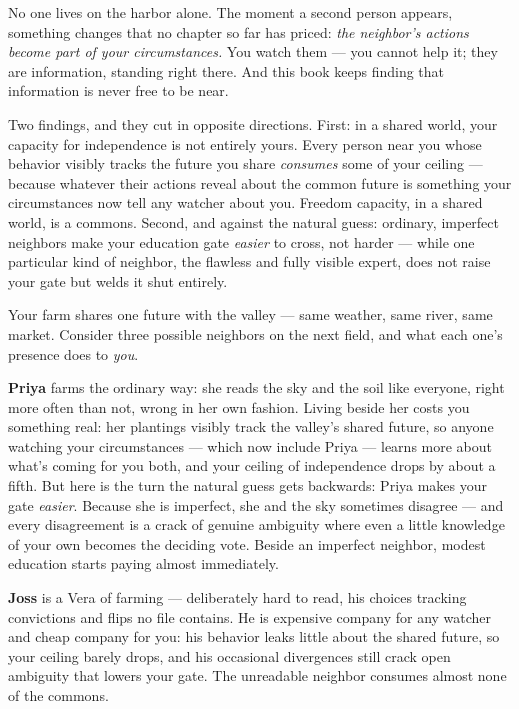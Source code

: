 
No one lives on the harbor alone. The moment a second person appears,
something changes that no chapter so far has priced: \emph{the neighbor's
actions become part of your circumstances.} You watch them --- you
cannot help it; they are information, standing right there. And this
book keeps finding that information is never free to be near.

Two findings, and they cut in opposite directions. First: in a shared
world, your capacity for independence is not entirely yours. Every
person near you whose behavior visibly tracks the future you share
\emph{consumes} some of your ceiling --- because whatever their actions
reveal about the common future is something your circumstances now
tell any watcher about you. Freedom capacity, in a shared world, is a
commons. Second, and against the natural guess: ordinary, imperfect neighbors make your education gate
\emph{easier} to cross, not harder --- while one particular kind of neighbor,
the flawless and fully visible expert, does not raise your gate but
welds it shut entirely.


Your farm shares one future with the valley --- same weather, same
river, same market. Consider three possible neighbors on the next
field, and what each one's presence does to \emph{you}.

\textbf{Priya} farms the ordinary way: she reads the sky and the soil like
everyone, right more often than not, wrong in her own fashion. Living
beside her costs you something real: her plantings visibly track the
valley's shared future, so anyone watching your circumstances --- which
now include Priya --- learns more about what's coming for you both, and
your ceiling of independence drops by about a fifth. But here is the
turn the natural guess gets backwards: Priya makes your gate \emph{easier}. Because she is
imperfect, she and the sky sometimes disagree --- and every disagreement
is a crack of genuine ambiguity where even a little knowledge of your
own becomes the deciding vote. Beside an imperfect neighbor, modest
education starts paying almost immediately.

\textbf{Joss} is a Vera of farming --- deliberately hard to read, his choices
tracking convictions and flips no file contains. He is expensive
company for any watcher and cheap company for you: his behavior leaks
little about the shared future, so your ceiling barely drops, and his
occasional divergences still crack open ambiguity that lowers your
gate. The unreadable neighbor consumes almost none of the commons.

